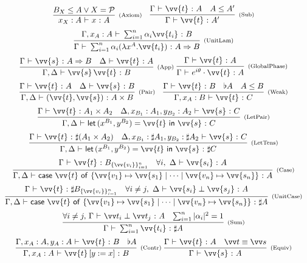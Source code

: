 \documentclass[runningheads,orivec,envcountsame,envcountsect]{llncs}
\newcommand\AbsBasis{\ensuremath{\mathcal{P}}}
\def\Pair#1#2{(#1,#2)} %
\def\Lam#1#2#3{\lambda#1^{#2}{.}#3} %
\def\letkeyword{\mathsf{let}}
\def\inkeyword{\mathsf{in}}
\def\LetP#1#2#3#4#5#6{\letkeyword\,\Pair{#1^{#2}}{#3^{#4}}=#5~\inkeyword~#6}
\def\gencase#1#2#3#4#5{\ensuremath{\mathsf{case}~#1~\mathsf{of}~\{#2\mapsto #4 \mid \dotsb \mid #3\mapsto #5\}}}
\def\Arr{\Rightarrow}
\def\SUB#1#2{#1\le#2}
\def\TYP#1#2#3{#1~{\vdash}~#2~{:}~#3}
\def\SORTH#1#2#3#4{#1~{\vdash}~#2\perp#3~{:}~#4}
\def\snam#1{\textsc{\scriptsize\upshape(#1)}}
\newcommand\basis[1]{\ensuremath{B_{ #1 }}}
\newcommand\genbasis[3]{\ensuremath{B_{\{#1\}_{#2}^{#3}}}}
\begin{document}
\begin{table}
    \small
    $
    \begin{array}{c}
    \infer[\snam{Axiom}]{\TYP{x_X:A}{x}{A}}{\basis{X}\leq A \vee X=\AbsBasis}\quad
    \infer[\snam{Sub}]{\TYP{\Gamma}{\vv{t}}{A'}}{
        \TYP{\Gamma}{\vv{t}}{A} & \SUB{A}{A'}
    }\\
    \noalign{\medskip}
    \infer[\snam{UnitLam}]{
        \TYP{\Gamma}{\sum_{i=1}^n \alpha_i (\Lam{x}{A}{\vv{t_i}})}{A\Arr B}
    }{\TYP{\Gamma,x_A: A}{\sum_{i=1}^{n}\alpha_i\vv{t_i}}{B}
    }\\
    \noalign{\medskip}
    \infer[\snam{App}]{\TYP{\Gamma,\Delta}{\vv{s}\,\vv{t}}{B}}{
        \TYP{\Gamma}{\vv{s}}{A\Arr B} & \TYP{\Delta}{\vv{t}}{A}
    }\ 
    \infer[\snam{GlobalPhase}]{\TYP{\Gamma}{e^{i\theta}\cdot\vv{t}}{A}}
    {\TYP{\Gamma}{\vv{t}}{A}}
    \\
    \noalign{\medskip}
    \infer[\snam{Pair}]{\TYP{\Gamma,\Delta}
        {\Pair{\vv{t}}{\vv{s}}}{A\times B}}{
        \TYP{\Gamma}{\vv{t}}{A}&\TYP{\Delta}{\vv{s}}{B}
    }\quad
    \infer[\snam{Weak}]{\TYP{\Gamma,x_A:B}{\vv{t}}{C}}{
        \TYP{\Gamma}{\vv{t}}{B}& \flat{A} & A\leq B
    }
    \\
    \noalign{\medskip}
    \infer[\snam{LetPair}]{\TYP{\Gamma,\Delta} 
        {\LetP{x}{B_1}{y}{B_2}{\vv{t}}{\vv{s}}}{C}}{
        \TYP{\Gamma}{\vv{t}}{A_1\times A_2}&
        \TYP{\Delta,x_{B_1}:A_1,y_{B_2}:A_2}{\vv{s}}{C}
    }\\
    \noalign{\medskip}
    \infer[\snam{LetTens}]{\TYP{\Gamma,\Delta}
        {\LetP{x}{B_1}{y}{B_2}{\vv{t}}{\vv{s}}}{\sharp C}}{
        \TYP{\Gamma}{\vv{t}}{\sharp(A_1\times A_2)}&
        \TYP{\Delta,x_{B_1}:\sharp A_1,y_{B_2}:\sharp A_2}{\vv{s}}{C}
    }\\
    \noalign{\medskip}
    \infer[\snam{Case}]{\TYP{\Gamma,\Delta}
        {\gencase{\vv{t}}{\vv{v_1}}{\vv{v_n}}{\vv{s_1}}{\vv{s_n}}}{A}}{
        \TYP{\Gamma}{\vv{t}}{\genbasis{\vv{v_i}}{i=1}{n}}&
        \forall i,\ \TYP{\Delta}{\vv{s_i}}{A}
    }\\
    \noalign{\medskip}
    \infer[\snam{UnitCase}]{\TYP{\Gamma,\Delta}
        {\gencase{\vv{t}}{\vv{v_1}}{\vv{v_n}}{\vv{s_1}}{\vv{s_n}}}{\sharp A}}{
        \TYP{\Gamma}{\vv{t}}{\sharp \genbasis{\vv{v_i}}{i=1}{n}}&
        \forall i\neq j,\ \SORTH{\Delta}{\vv{s_i}}{\vv{s_j}}{A}
    }\\
    \noalign{\medskip}
    \infer[\snam{Sum}]
        {\TYP{\Gamma}{\sum_{i=1}^{n} \vv{t_i}}{\sharp A}}
        {\forall i\neq j,\, \SORTH{\Gamma}{\vv t_i}{\vv t_j}{A} &
        \sum_{i=1}^{n}|\alpha_i|^2 = 1}
    \\
    \noalign{\medskip}
    \infer[\snam{Contr}]{\TYP{\Gamma,x_A:A}{\vv{t}\,[y:=x]}{B}}{
        \TYP{\Gamma,x_A:A,y_A:A}{\vv{t}}{B}&\flat{A}
    }\ 
    \infer[\snam{Equiv}]{\TYP{\Gamma}{\vv{s}}{A}}{
        \TYP{\Gamma}{\vv{t}}{A}& \vv t\equiv \vv s
    }\\
    \noalign{\medskip}
    \end{array}
    $


\end{table}
\end{document}
